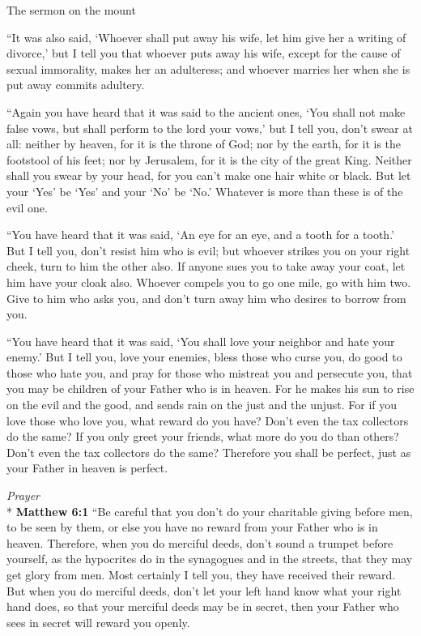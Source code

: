 \documentclass[10pt,twoside]{article} %
\newcommand{\quotesize}{\normalsize{}}
\newenvironment{quotetext}{\begingroup\quotesize}{\endgroup}
\newcommand{\intex}[1]{\index[texts]{#1}}
\newcommand{\bible}[2]{\begin{quotetext}\textbf{#1}\intex{#1} #2\end{quotetext}}
\newcommand{\matthew}[2]{\bible{Matthew #1}{#2}}
\newcommand{\subhead}[1]{\emph{#1}\\*}
\begin{document}
\begin{section}{The sermon on the mount}
{   ``It was also said, `Whoever shall put away his wife, let him give her a writing of divorce,'    but I tell you that whoever puts away his wife, except for the cause of sexual immorality, makes her an adulteress; and whoever marries her when she is put away commits adultery.

   ``Again you have heard that it was said to the ancient ones, `You shall not make false vows, but shall perform to the lord your vows,'    but I tell you, don't swear at all: neither by heaven, for it is the throne of God;    nor by the earth, for it is the footstool of his feet; nor by Jerusalem, for it is the city of the great King.    Neither shall you swear by your head, for you can't make one hair white or black.    But let your `Yes' be `Yes' and your `No' be `No.' Whatever is more than these is of the evil one.

   ``You have heard that it was said, `An eye for an eye, and a tooth for a tooth.'    But I tell you, don't resist him who is evil; but whoever strikes you on your right cheek, turn to him the other also.    If anyone sues you to take away your coat, let him have your cloak also.    Whoever compels you to go one mile, go with him two.    Give to him who asks you, and don't turn away him who desires to borrow from you.

   ``You have heard that it was said, `You shall love your neighbor  and hate your enemy.'    But I tell you, love your enemies, bless those who curse you, do good to those who hate you, and pray for those who mistreat you and persecute you,    that you may be children of your Father who is in heaven. For he makes his sun to rise on the evil and the good, and sends rain on the just and the unjust.    For if you love those who love you, what reward do you have? Don't even the tax collectors do the same?    If you only greet your friends, what more do you do than others? Don't even the tax collectors do the same?    Therefore you shall be perfect, just as your Father in heaven is perfect.
}

\subhead{Prayer}
\matthew{6:1}{
    ``Be careful that you don't do your charitable giving before men, to be seen by them, or else you have no reward from your Father who is in heaven.    Therefore, when you do merciful deeds, don't sound a trumpet before yourself, as the hypocrites do in the synagogues and in the streets, that they may get glory from men. Most certainly I tell you, they have received their reward.    But when you do merciful deeds, don't let your left hand know what your right hand does,    so that your merciful deeds may be in secret, then your Father who sees in secret will reward you openly.

}
\end{section}
\end{document}
